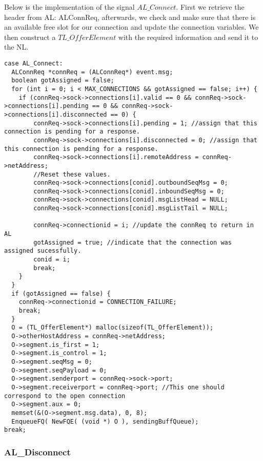 Below is the implementation of the signal $AL\_Connect$.
First we retrieve the header from AL: ALConnReq, afterwards, we check and make sure that
there is an available free slot for our connection and update the connection variables.
We then construct a $TL\_OfferElement$ with the required information and send it to the NL.
\begin{lstlisting}
case AL_Connect:
  ALConnReq *connReq = (ALConnReq*) event.msg;
  boolean gotAssigned = false;
  for (int i = 0; i < MAX_CONNECTIONS && gotAssigned == false; i++) {
    if (connReq->sock->connections[i].valid == 0 && connReq->sock->connections[i].pending == 0 && connReq->sock->connections[i].disconnected == 0) {
        connReq->sock->connections[i].pending = 1; //assign that this connection is pending for a response.
        connReq->sock->connections[i].disconnected = 0; //assign that this connection is pending for a response.
        connReq->sock->connections[i].remoteAddress = connReq->netAddress;
        //Reset these values.
        connReq->sock->connections[conid].outboundSeqMsg = 0;
        connReq->sock->connections[conid].inboundSeqMsg = 0;
        connReq->sock->connections[conid].msgListHead = NULL;
        connReq->sock->connections[conid].msgListTail = NULL;

        connReq->connectionid = i; //update the connReq to return in AL
        gotAssigned = true; //indicate that the connection was assigned sucessfully.
        conid = i;
        break;
    }
  }
  if (gotAssigned == false) {
    connReq->connectionid = CONNECTION_FAILURE;
    break;
  }
  O = (TL_OfferElement*) malloc(sizeof(TL_OfferElement));
  O->otherHostAddress = connReq->netAddress;
  O->segment.is_first = 1;
  O->segment.is_control = 1;
  O->segment.seqMsg = 0;
  O->segment.seqPayload = 0;
  O->segment.senderport = connReq->sock->port;
  O->segment.receiverport = connReq->port; //This one should correspond to the open connection
  O->segment.aux = 0;
  memset(&(O->segment.msg.data), 0, 8);
  EnqueueFQ( NewFQE( (void *) O ), sendingBuffQueue);
break;
\end{lstlisting}


\subsubsection{AL\_Disconnect}

